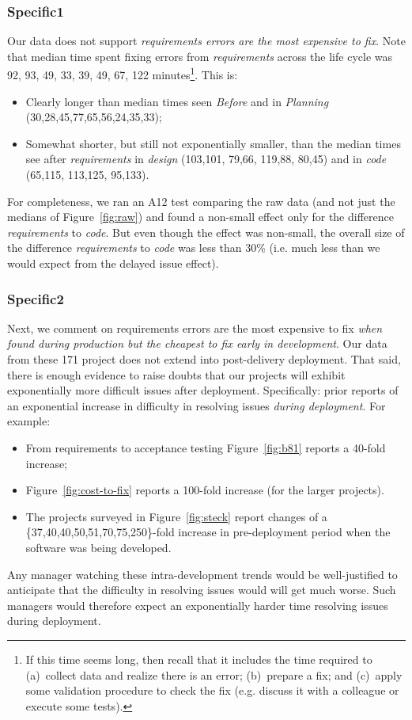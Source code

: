 \documentclass{sig-alternate}
\newcommand{\bi}{\begin{itemize}}%
\newcommand{\ei}{\end{itemize}}
\newcommand{\fig}[1]{Figure~\ref{fig:#1}}
\begin{document}
 


\subsubsection{Specific1}

Our data does not support   
{\em  requirements errors are the most expensive to fix}.
Note that   median time spent fixing errors from {\em requirements} across the life cycle was 92, 93,  49, 33, 39, 49, 67, 122 minutes\footnote{If this time seems long, then recall
that it includes the time required  to (a)~collect data and realize there is an error;
(b)~prepare a fix;  and (c)~apply some validation
procedure to check the fix (e.g. discuss it with a colleague or execute some tests).}.
This is:
\bi
\item
Clearly longer than median times seen {\em Before } and in {\em Planning}
(30,28,45,77,65,56,24,35,33);
\item
Somewhat shorter, but still not exponentially smaller,  than the median times see after {\em requirements} in {\em design}
(103,101, 79,66, 119,88, 80,45) and in {\em code} (65,115, 113,125, 95,133). 
\ei
For completeness, we ran an  
A12 test comparing the raw data (and not just the medians of \fig{raw}) and found
 a non-small effect only for the difference {\em requirements}
to {\em code}. But even though the effect was non-small, 
 the overall size of the difference
{\em requirements} to {\em code} was less than 30\% (i.e. much less than we would
expect from the delayed issue effect). 
\subsubsection{Specific2}
Next, we comment on 
requirements errors are the most expensive to fix 
{\em when found during production but the cheapest to fix early in development}. 
Our data from these 171 project does not extend into post-delivery deployment. That said,
there is enough evidence to raise doubts that our projects will exhibit exponentially more
difficult issues after deployment. 
Specifically: prior reports of an  exponential increase in difficulty in resolving issues {\em during
deployment}.
For example:
\bi
\item  From requirements to acceptance testing
\fig{b81} reports a 40-fold increase;
\item
 \fig{cost-to-fix} reports a 100-fold increase
(for the larger projects).
\item
The projects surveyed in \fig{steck} report changes of a  \newline
\{37,40,40,50,51,70,75,250\}-fold increase in pre-deployment period when the software was being developed.
\ei
Any manager watching  these intra-development trends would be well-justified
to anticipate that  the difficulty in resolving issues would will get much worse. Such managers
would therefore expect an exponentially harder time resolving issues during deployment.
\end{document}
